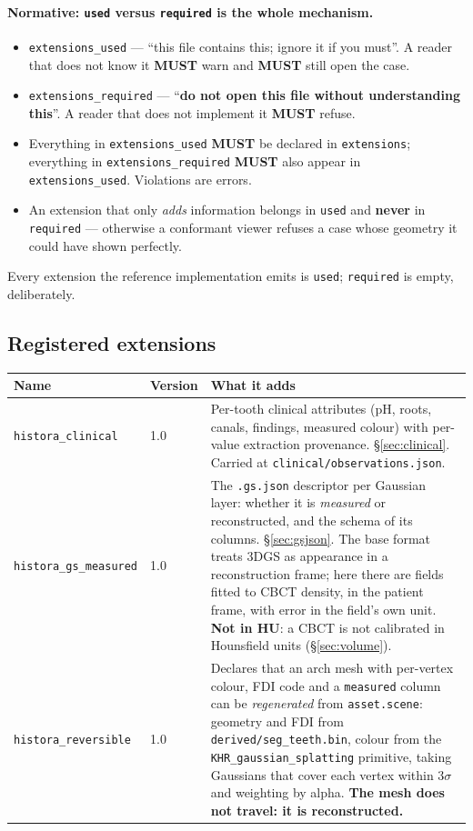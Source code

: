 \documentclass[11pt,a4paper]{article}
\newcommand{\MUST}{\textcolor{uosred}{\textbf{MUST}}}
\newcommand{\code}[1]{\texttt{\small #1}}
\begin{document}
\paragraph{Normative: \code{used} versus \code{required} is the whole mechanism.}
\begin{itemize}
  \item \code{extensions\_used} --- ``this file contains this; ignore it if you must''. A
  reader that does not know it \MUST{} warn and \MUST{} still open the case.
  \item \code{extensions\_required} --- ``\textbf{do not open this file without
  understanding this}''. A reader that does not implement it \MUST{} refuse.
  \item Everything in \code{extensions\_used} \MUST{} be declared in \code{extensions};
  everything in \code{extensions\_required} \MUST{} also appear in \code{extensions\_used}.
  Violations are errors.
  \item An extension that only \emph{adds} information belongs in \code{used} and
  \textbf{never} in \code{required} --- otherwise a conformant viewer refuses a case whose
  geometry it could have shown perfectly.
\end{itemize}
Every extension the reference implementation emits is \code{used}; \code{required} is
empty, deliberately.

\subsection{Registered extensions}

\begin{longtable}{L{3.0cm} L{2.0cm} L{10.0cm}}
\toprule
\textbf{Name} & \textbf{Version} & \textbf{What it adds}\\
\midrule
\endhead
\code{histora\_clinical} & 1.0 & Per-tooth clinical attributes (pH, roots, canals, findings,
measured colour) with per-value extraction provenance. \S\ref{sec:clinical}. Carried at
\code{clinical/observations.json}.\\
\code{histora\_gs\_measured} & 1.0 & The \code{.gs.json} descriptor per Gaussian layer:
whether it is \emph{measured} or reconstructed, and the schema of its columns.
\S\ref{sec:gsjson}. The base format treats 3DGS as appearance in a reconstruction frame;
here there are fields fitted to CBCT density, in the patient frame, with error in the field's own unit. \textbf{Not in HU}: a CBCT is not calibrated in Hounsfield units (\S\ref{sec:volume}).\\
\code{histora\_reversible} & 1.0 & Declares that an arch mesh with per-vertex colour, FDI code
and a \code{measured} column can be \emph{regenerated} from \code{asset.scene}: geometry
and FDI from \code{derived/seg\_teeth.bin}, colour from the
\code{KHR\_gaussian\_splatting} primitive, taking Gaussians that cover each vertex within
$3\sigma$ and weighting by alpha. \textbf{The mesh does not travel: it is reconstructed.}\\
\bottomrule
\end{longtable}
\end{document}
